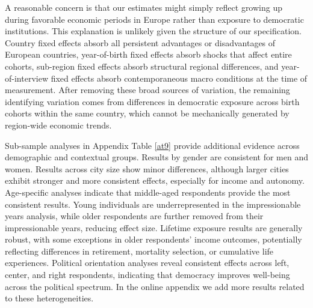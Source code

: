 \documentclass[11pt]{article}
\begin{document}
A reasonable concern is that our estimates might simply reflect growing up during favorable economic periods in Europe rather than exposure to democratic institutions. This explanation is unlikely given the structure of our specification. Country fixed effects absorb all persistent advantages or disadvantages of European countries, year-of-birth fixed effects absorb shocks that affect entire cohorts, sub-region fixed effects absorb structural regional differences, and year-of-interview fixed effects absorb contemporaneous macro conditions at the time of measurement. After removing these broad sources of variation, the remaining identifying variation comes from differences in democratic exposure across birth cohorts within the same country, which cannot be mechanically generated by region-wide economic trends.

Sub-sample analyses in Appendix Table \ref{at9} provide additional evidence across demographic and contextual groups. Results by gender are consistent for men and women. Results across city size show minor differences, although larger cities exhibit stronger and more consistent effects, especially for income and autonomy. Age-specific analyses indicate that middle-aged respondents provide the most consistent results. Young individuals are underrepresented in the impressionable years analysis, while older respondents are further removed from their impressionable years, reducing effect size. Lifetime exposure results are generally robust, with some exceptions in older respondents’ income outcomes, potentially reflecting differences in retirement, mortality selection, or cumulative life experiences. Political orientation analyses reveal consistent effects across left, center, and right respondents, indicating that democracy improves well-being across the political spectrum. In the online appendix we add more results related to these heterogeneities. 
\end{document}
